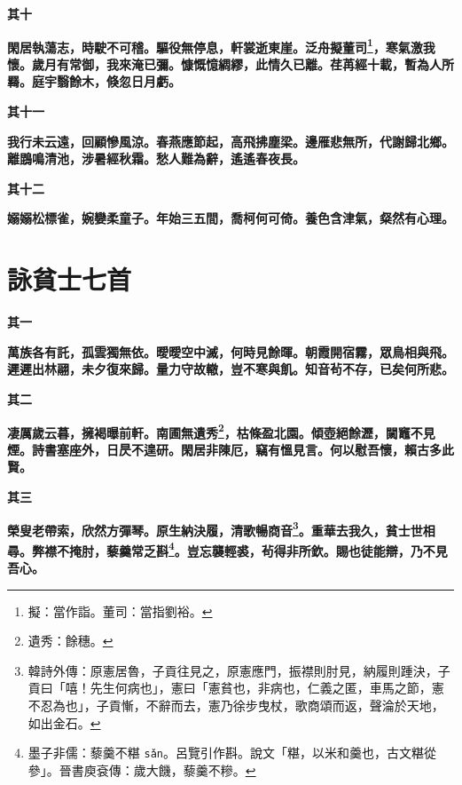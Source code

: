 \begin{quoting}\textbf{其十}\end{quoting}

\textbf{閑居執蕩志，時駛不可稽。驅役無停息，軒裳逝東崖。泛舟擬董司\footnote{擬：當作詣。董司：當指劉裕。}，寒氣激我懷。歲月有常御，我來淹已彌。慷慨憶綢繆，此情久已離。荏苒經十載，暫為人所羇。庭宇翳餘木，倏忽日月虧。}

\begin{quoting}\textbf{其十一}\end{quoting}

\textbf{我行未云遠，回顧慘風涼。春燕應節起，高飛拂塵梁。邊雁悲無所，代謝歸北鄉。離鵾鳴清池，涉暑經秋霜。愁人難為辭，遙遙春夜長。}

\begin{quoting}\textbf{其十二}\end{quoting}

\textbf{嫋嫋松標雀，婉孌柔童子。年始三五間，喬柯何可倚。養色含津氣，粲然有心理。}

\section{詠貧士七首}

\begin{quoting}\textbf{其一}\end{quoting}

\textbf{萬族各有託，孤雲獨無依。曖曖空中滅，何時見餘暉。朝霞開宿霧，眾鳥相與飛。遲遲出林翮，未夕復來歸。量力守故轍，豈不寒與飢。知音茍不存，已矣何所悲。}

\begin{quoting}\textbf{其二}\end{quoting}

\textbf{凄厲歲云暮，擁褐曝前軒。南圃無遺秀\footnote{遺秀：餘穗。}，枯條盈北園。傾壺絕餘瀝，闚竈不見煙。詩書塞座外，日昃不遑研。閑居非陳厄，竊有慍見言。何以慰吾懷，賴古多此賢。}

\begin{quoting}\textbf{其三}\end{quoting}

\textbf{榮叟老帶索，欣然方彈琴。原生納決履，清歌暢商音\footnote{韓詩外傳：原憲居魯，子貢往見之，原憲應門，振襟則肘見，納履則踵決，子貢曰「嘻！先生何病也」，憲曰「憲貧也，非病也，仁義之匿，車馬之節，憲不忍為也」，子貢慚，不辭而去，憲乃徐步曳杖，歌商頌而返，聲淪於天地，如出金石。}。重華去我久，貧士世相尋。弊襟不掩肘，藜羹常乏斟\footnote{墨子非儒：藜羹不糂 \texttt{sǎn}。呂覽引作斟。說文「糂，以米和羹也，古文糂從參」。晉書庾袞傳：歲大饑，藜羹不糝。}。豈忘襲輕裘，茍得非所欽。賜也徒能辯，乃不見吾心。}

